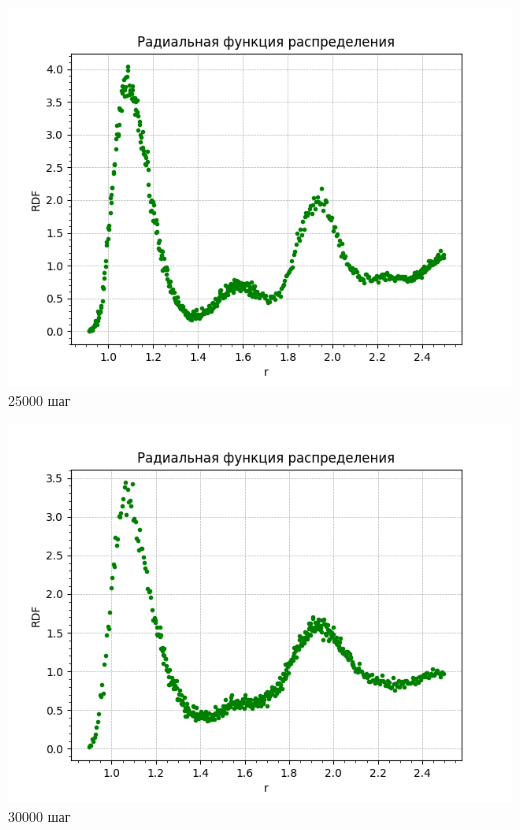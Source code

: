 \begin{minipage}{0.3\textwidth}
    \begin{center}
        \includegraphics[width=\linewidth]{6.png}\\
        25000 шаг
    \end{center}
   
\end{minipage}
\begin{minipage}{0.05\textwidth}
\begin{center}

\Longrightarrow

\end{center}
\end{minipage}
\begin{minipage}{0.3\textwidth}
    \begin{center}
        \includegraphics[width=\linewidth]{7.png}\\
        30000 шаг
    \end{center}
\end{minipage}
